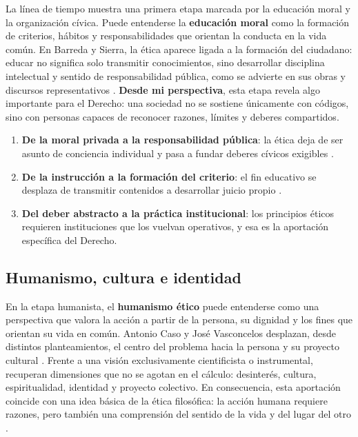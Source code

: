 \documentclass[
	spanish,
	letterpaper, oneside
]{article}
\begin{document}
La línea de tiempo muestra una primera etapa marcada por la educación moral y la organización cívica. Puede entenderse la \textbf{educación moral} como la formación de criterios, hábitos y responsabilidades que orientan la conducta en la vida común. En Barreda y Sierra, la ética aparece ligada a la formación del ciudadano: educar no significa solo transmitir conocimientos, sino desarrollar disciplina intelectual y sentido de responsabilidad pública, como se advierte en sus obras y discursos representativos \citep{barredaOracionCivica1867,sierraUniversidadNacional1910}. \textbf{Desde mi perspectiva}, esta etapa revela algo importante para el Derecho: una sociedad no se sostiene únicamente con códigos, sino con personas capaces de reconocer razones, límites y deberes compartidos.

\begin{enumerate}
  \item \textbf{De la moral privada a la responsabilidad pública}: la ética deja de ser asunto de conciencia individual y pasa a fundar deberes cívicos exigibles \citep{barredaOracionCivica1867}.
  \item \textbf{De la instrucción a la formación del criterio}: el fin educativo se desplaza de transmitir contenidos a desarrollar juicio propio \citep{sierraUniversidadNacional1910}.
  \item \textbf{Del deber abstracto a la práctica institucional}: los principios éticos requieren instituciones que los vuelvan operativos, y esa es la aportación específica del Derecho.
\end{enumerate}

\subsection{Humanismo, cultura e identidad}

En la etapa humanista, el \textbf{humanismo ético} puede entenderse como una perspectiva que valora la acción a partir de la persona, su dignidad y los fines que orientan su vida en común. Antonio Caso y José Vasconcelos desplazan, desde distintos planteamientos, el centro del problema hacia la persona y su proyecto cultural \citep{casoExistencia1916,vasconcelosRazaCosmica1925}. Frente a una visión exclusivamente cientificista o instrumental, recuperan dimensiones que no se agotan en el cálculo: desinterés, cultura, espiritualidad, identidad y proyecto colectivo. En consecuencia, esta aportación coincide con una idea básica de la ética filosófica: la acción humana requiere razones, pero también una comprensión del sentido de la vida y del lugar del otro \citep{huertaEticaConClasicos2000,singerCompendioEtica1995}.
\end{document}

